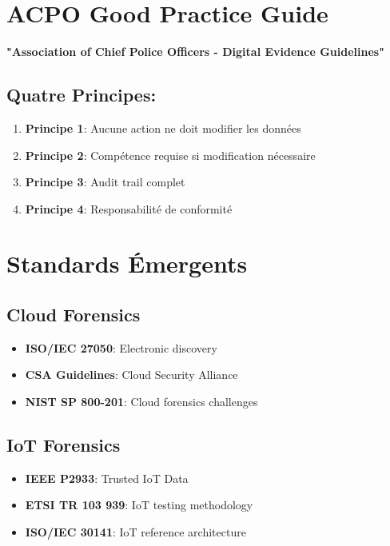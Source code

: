 \section{ACPO Good Practice Guide}
\textbf{"Association of Chief Police Officers - Digital Evidence Guidelines"}

\subsection{Quatre Principes:}
\begin{enumerate}
\item \textbf{Principe 1}: Aucune action ne doit modifier les données
\item \textbf{Principe 2}: Compétence requise si modification nécessaire
\item \textbf{Principe 3}: Audit trail complet
\item \textbf{Principe 4}: Responsabilité de conformité
\end{enumerate}

\section{Standards Émergents}
\subsection{Cloud Forensics}
\begin{itemize}
\item \textbf{ISO/IEC 27050}: Electronic discovery
\item \textbf{CSA Guidelines}: Cloud Security Alliance
\item \textbf{NIST SP 800-201}: Cloud forensics challenges
\end{itemize}

\subsection{IoT Forensics}
\begin{itemize}
\item \textbf{IEEE P2933}: Trusted IoT Data
\item \textbf{ETSI TR 103 939}: IoT testing methodology
\item \textbf{ISO/IEC 30141}: IoT reference architecture
\end{itemize}